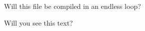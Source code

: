 \documentclass[12pt,a4paper]{article}
\begin{document}
Will this file be compiled in an endless loop?


Will you see this text?
\end{document}

